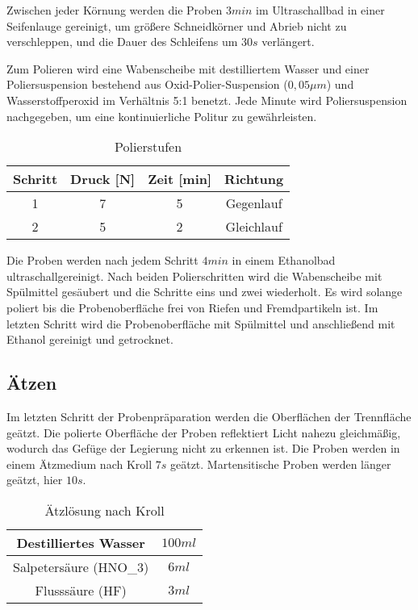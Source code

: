 Zwischen jeder Körnung werden die Proben $3 min$ im Ultraschallbad in einer Seifenlauge gereinigt, um größere Schneidkörner und Abrieb nicht zu verschleppen, und die Dauer des Schleifens um $30 s$ verlängert. 

Zum Polieren wird eine Wabenscheibe mit destilliertem Wasser und einer Poliersuspension bestehend aus Oxid-Polier-Suspension ($0,05 \mu m$) und Wasserstoffperoxid im Verhältnis 5:1 benetzt. Jede Minute wird Poliersuspension nachgegeben, um eine kontinuierliche Politur zu gewährleisten.

\begin{table}[h]
	\centering

	\begin{tabular}{|c|c|c|c|}
		\hline 
		Schritt & Druck [N] & Zeit [min] & Richtung \\ 
		\hline 
		1 & 7 & 5 & Gegenlauf \\ 
		\hline 
		2 & 5 & 2 & Gleichlauf \\ 
	\hline 
	\end{tabular} 
	\caption{Polierstufen}
	\label{tab:Polierstufen}
\end{table}

Die Proben werden nach jedem Schritt $4 min$ in einem Ethanolbad ultraschallgereinigt. Nach beiden Polierschritten wird die Wabenscheibe mit Spülmittel gesäubert und die Schritte eins und zwei wiederholt. Es wird solange poliert bis die Probenoberfläche frei von Riefen und Fremdpartikeln ist. Im letzten Schritt wird die Probenoberfläche mit Spülmittel und anschließend mit Ethanol gereinigt und getrocknet. 


\subsection{Ätzen}

Im letzten Schritt der Probenpräparation werden die Oberflächen der Trennfläche geätzt. Die polierte Oberfläche der Proben reflektiert Licht nahezu gleichmäßig, wodurch das Gefüge der Legierung nicht zu erkennen ist. 
Die Proben werden in einem Ätzmedium nach Kroll $7s$ geätzt. Martensitische Proben werden länger geätzt, hier $10s$. 

\begin{table}[h]
	\centering
	\begin{tabular}{|c|c|}
		
		\hline 
		Destilliertes Wasser
		& $100ml$
		\\ 
		\hline 
		Salpetersäure (HNO_{3})	& $6ml$
		\\ 
		\hline 
		Flusssäure (HF) & $3ml$
		\\ 
		\hline 
	\end{tabular} 
	\caption{Ätzlösung nach Kroll}
	\label{tab:Ätz_Kroll}
\end{table}


